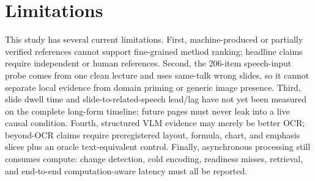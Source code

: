 \section{Limitations}

This study has several current limitations. First, machine-produced or partially
verified references cannot support fine-grained method ranking; headline claims
require independent or human references. Second, the 206-item speech-input
probe comes from one clean lecture and uses same-talk wrong slides, so it cannot
separate local evidence from domain priming or generic image presence. Third,
slide dwell time and slide-to-related-speech lead/lag have not yet been measured
on the complete long-form timeline; future pages must never leak into a live
causal condition. Fourth, structured VLM evidence may merely be better OCR;
beyond-OCR claims require preregistered layout, formula, chart, and emphasis
slices plus an oracle text-equivalent control. Finally, asynchronous processing
still consumes compute: change detection, cold encoding, readiness misses,
retrieval, and end-to-end computation-aware latency must all be reported.

